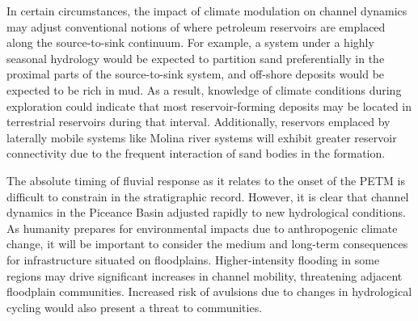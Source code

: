 \documentclass[draft]{compact_proposal}
\begin{document}
In certain circumstances, the impact of climate modulation on channel dynamics may adjust conventional notions of where petroleum reservoirs are emplaced along the source-to-sink continuum.
For example, a system under a highly seasonal hydrology would be expected to partition sand preferentially in the proximal parts of the source-to-sink system, and off-shore deposits would be expected to be rich in mud.
As a result, knowledge of climate conditions during exploration could indicate that most reservoir-forming deposits may be located in terrestrial reservoirs during that interval.
Additionally, reservors emplaced by laterally mobile systems like Molina river systems will exhibit greater reservoir connectivity due to the frequent interaction of sand bodies in the formation.

The absolute timing of fluvial response as it relates to the onset of the PETM is difficult to constrain in the stratigraphic record.
However, it is clear that channel dynamics in the Piceance Basin adjusted rapidly to new hydrological conditions.
As humanity prepares for environmental impacts due to anthropogenic climate change, it will be important to consider the medium and long-term consequences for infrastructure situated on floodplains.
Higher-intensity flooding in some regions may drive significant increases in channel mobility, threatening adjacent floodplain communities.
Increased risk of avulsions due to changes in hydrological cycling would also present a threat to communities.



\printbibliography
\end{document}
